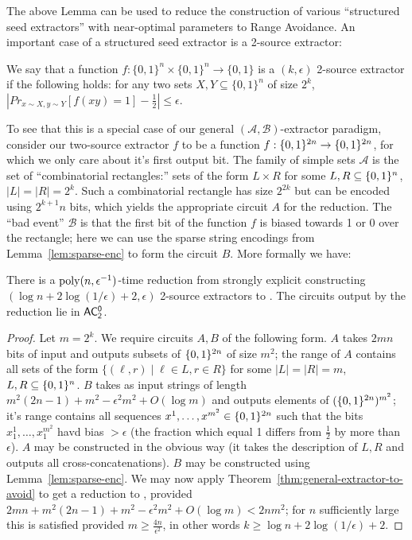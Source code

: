 The above Lemma can be used to reduce the construction of various ``structured seed extractors'' with near-optimal parameters to Range Avoidance. An important case of a structured seed extractor is a 2-source extractor: 
\begin{definition}\label{range:def:two-source-extractor}
We say that a function $f:\{0,1\}^n \times \{0,1\}^n \rightarrow \{0,1\}$ is a $(k,\epsilon)$ 2-source extractor if the following holds: for any two sets $X,Y \subseteq \{0,1\}^n$ of size $2^k$, $|Pr_{x \sim X, y \sim Y}[f(xy) = 1] - \frac{1}{2}| \leq \epsilon$.
\end{definition}
To see that this is a special case of our general $(\mathcal{A}, \mathcal{B})$-extractor paradigm, consider our two-source extractor $f$ to be a function $f: \{0,1\}^{2n} \to \{0,1\}^{2n}$, for which we only care about it's first output bit. The family of simple sets $\mathcal{A}$ is the set of ``combinatorial rectangles:'' sets of the form $L \times R$ for some $L, R \subseteq \{0,1\}^n$, $|L|=|R|=2^k$. Such a combinatorial rectangle has size $2^{2k}$ but can be encoded using $2^{k+1}n$ bits, which yields the appropriate circuit $A$ for the reduction. The ``bad event'' $\mathcal{B}$ is that the first bit of the function $f$ is biased towards 1 or 0 over the rectangle; here we can use the sparse string encodings from Lemma~\ref{lem:sparse-enc} to form the circuit $B$. More formally we have:
\begin{theorem}\label{thm:two-source-to-avoid}
There is a $\mathrm{poly}(n, \epsilon^{-1})$-time reduction from strongly explicit constructing $( \log n + 2 \log (1/\epsilon) + 2, \epsilon)$ 2-source extractors to \avoid. The circuits output by the reduction lie in $\cl{AC^0_2}$.
\end{theorem}
\begin{proof}
Let $m= 2^k$. We require circuits $A,B$ of the following form. $A$ takes $2mn$ bits of input and outputs subsets of $\{0,1\}^{2n}$ of size $m^2$; the range of $A$ contains all sets of the form $\{ (\ell,r) \mid \ell \in L, r \in R\}$ for some $|L| = |R| = m$, $L, R \subseteq \{0,1\}^n$. $B$ takes as input strings of length $m^2(2n-1) + m^2 - \epsilon^2 m^2 + O(\log m)$ and outputs elements of $(\{0,1\}^{2n})^{m^2}$; it's range contains all sequences $x^1, \ldots, x^{m^2} \in \{0,1\}^{2n}$ such that the bits $x_1^1,\ldots,x_1^{m^2}$ havd bias $>\epsilon$ (the fraction which equal 1 differs from $\frac{1}{2}$ by more than $\epsilon$). $A$ may be constructed in the obvious way (it takes the description of $L,R$ and outputs all cross-concatenations). $B$ may be constructed using Lemma~\ref{lem:sparse-enc}. We may now apply Theorem~\ref{thm:general-extractor-to-avoid} to get a reduction to \avoid, provided $2mn + m^2(2n-1) + m^2 - \epsilon^2 m^2 + O(\log m) < 2nm^2$; for $n$ sufficiently large this is satisfied provided $m \geq \frac{4n}{\epsilon^2}$, in other words $k \geq \log n + 2 \log(1/\epsilon) + 2$.
\end{proof}

